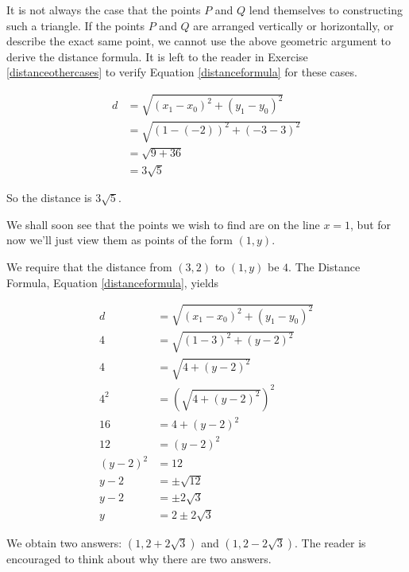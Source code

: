 \medskip

It is not always the case that the points $P$ and $Q$ lend themselves to constructing such a triangle.  If the points $P$ and $Q$ are arranged vertically or horizontally, or describe the exact same point, we cannot use the above geometric argument to derive the distance formula.  It is left to the reader in Exercise \ref{distanceothercases} to verify Equation \ref{distanceformula} for these cases.

\medskip

{
\begin{align*}
 d & =  \sqrt{\left(x_{1} - x_{0} \right)^2 + \left(y_{1} - y_{0} \right)^2} \\
   & =  \sqrt{ (1-(-2))^2 + (-3-3)^2} \\
   & =  \sqrt{9 + 36} \\
   & =  3 \sqrt{5}
\end{align*}

So the distance is $3 \sqrt{5}$. 
}

\medskip

{
We shall soon see that the points we wish to find are on the line $x=1$, but for now we'll just view them as points of the form $(1,y)$.  

We require that the distance from $(3,2)$ to $(1,y)$ be $4$.  The Distance Formula, Equation \ref{distanceformula}, yields

\begin{align*} 
d &  =  \sqrt{\left(x_{1}-x_{0}\right)^2+\left(y_{1}-y_{0}\right)^2} \\
4 &  =  \sqrt{(1-3)^2+(y-2)^2}  \\
4  & =  \sqrt{4+(y-2)^2}  \\ 
4^2 & =  \left(\sqrt{4+(y-2)^2}\right)^2   \tag*{squaring both sides} \\
16 & =  4+(y-2)^2 \\
12 & =  (y-2)^2  \\
(y-2)^2 & =  12   \\
y - 2 & =  \pm \sqrt{12} \tag*{extracting the square root} \\
y-2 & =  \pm 2 \sqrt{3}  \\
y & =  2 \pm 2 \sqrt{3}   
\end{align*}


We obtain two answers:  $(1, 2 + 2 \sqrt{3})$ and $(1, 2-2 \sqrt{3}).$  The reader is encouraged to think about why there are two answers.}

